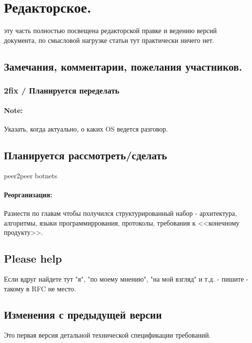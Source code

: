 \section{Редакторское.}


\label{section_paper_workflow}

эту часть полностью посвещена редакторской правке и ведению версий документа, по смысловой нагрузке статьи тут практически ничего нет.

\subsection{Замечания, комментарии, пожелания участников.}

\subsubsection{2fix / Планируется переделать}

\label{paper_2do_1}
\paragraph{Note:} Указать, когда актуально, о каких OS ведется разговор.

\subsection{Планируется рассмотреть/сделать}
\label{paper_2do_2}
peer2peer botnets\\
\paragraph{Реорганизация:\\}
Разнести по главам чтобы получился структурированный набор - архитектура, алгоритмы, языки программиррования, протоколы, требования к <<конечному продукту>>.\\

\subsection{Please help}

Если вдруг найдете тут "я", "по моему мнению", "на мой взгляд" и т.д. - пишите - такому в  RFC не место.\\

\subsection{Изменения с предыдущей версии}

Это первая версия детальной технической спецификации требований.
